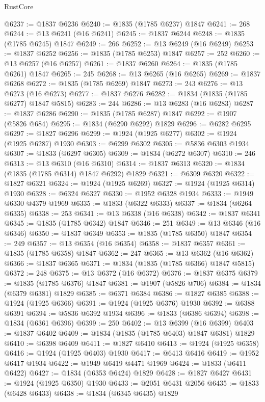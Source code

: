 \begin{lexlean}{RustCore}
\begin{coremodule}
@6237 := @1837 @6236
@6240 := @1835 (@1785 @6237) @1847
@6241 := 268
@6244 := @13 @6241 (@16 @6241)
@6245 := @1837 @6244
@6248 := @1835 (@1785 @6245) @1847
@6249 := 266
@6252 := @13 @6249 (@16 @6249)
@6253 := @1837 @6252
@6256 := @1835 (@1785 @6253) @1847
@6257 := 252
@6260 := @13 @6257 (@16 @6257)
@6261 := @1837 @6260
@6264 := @1835 (@1785 @6261) @1847
@6265 := 245
@6268 := @13 @6265 (@16 @6265)
@6269 := @1837 @6268
@6272 := @1835 (@1785 @6269) @1847
@6273 := 243
@6276 := @13 @6273 (@16 @6273)
@6277 := @1837 @6276
@6282 := @1834 (@1835 (@1785 @6277) @1847 @5815)
@6283 := 244
@6286 := @13 @6283 (@16 @6283)
@6287 := @1837 @6286
@6290 := @1835 (@1785 @6287) @1847
@6292 := @1907 (@5826 @684)
@6295 := @1834 (@6290 @6292) @1829
@6296 := @6282 @6295
@6297 := @1827 @6296
@6299 := @1924 (@1925 @6277)
@6302 := @1924 (@1925 @6287) @1930
@6303 := @6299 @6302
@6305 := @5836 @6303 @1934
@6307 := @1833 (@6297 @6305)
@6309 := @1834 (@6272 @6307)
@6310 := 246
@6313 := @13 @6310 (@16 @6310)
@6314 := @1837 @6313
@6320 := @1834 (@1835 (@1785 @6314) @1847 @6292) @1829
@6321 := @6309 @6320
@6322 := @1827 @6321
@6324 := @1924 (@1925 @6269)
@6327 := @1924 (@1925 @6314) @1930
@6328 := @6324 @6327
@6330 := @1952 @6328 @1934
@6333 := @1949 @6330 @4379 @1969
@6335 := @1833 (@6322 @6333)
@6337 := @1834 (@6264 @6335)
@6338 := 253
@6341 := @13 @6338 (@16 @6338)
@6342 := @1837 @6341
@6345 := @1835 (@1785 @6342) @1847
@6346 := 251
@6349 := @13 @6346 (@16 @6346)
@6350 := @1837 @6349
@6353 := @1835 (@1785 @6350) @1847
@6354 := 249
@6357 := @13 @6354 (@16 @6354)
@6358 := @1837 @6357
@6361 := @1835 (@1785 @6358) @1847
@6362 := 247
@6365 := @13 @6362 (@16 @6362)
@6366 := @1837 @6365
@6371 := @1834 (@1835 (@1785 @6366) @1847 @5815)
@6372 := 248
@6375 := @13 @6372 (@16 @6372)
@6376 := @1837 @6375
@6379 := @1835 (@1785 @6376) @1847
@6381 := @1907 (@5826 @706)
@6384 := @1834 (@6379 @6381) @1829
@6385 := @6371 @6384
@6386 := @1827 @6385
@6388 := @1924 (@1925 @6366)
@6391 := @1924 (@1925 @6376) @1930
@6392 := @6388 @6391
@6394 := @5836 @6392 @1934
@6396 := @1833 (@6386 @6394)
@6398 := @1834 (@6361 @6396)
@6399 := 250
@6402 := @13 @6399 (@16 @6399)
@6403 := @1837 @6402
@6409 := @1834 (@1835 (@1785 @6403) @1847 @6381) @1829
@6410 := @6398 @6409
@6411 := @1827 @6410
@6413 := @1924 (@1925 @6358)
@6416 := @1924 (@1925 @6403) @1930
@6417 := @6413 @6416
@6419 := @1952 @6417 @1934
@6422 := @1949 @6419 @4471 @1969
@6424 := @1833 (@6411 @6422)
@6427 := @1834 (@6353 @6424) @1829
@6428 := @1827 @6427
@6431 := @1924 (@1925 @6350) @1930
@6433 := @2051 @6431 @2056
@6435 := @1833 (@6428 @6433)
@6438 := @1834 (@6345 @6435) @1829

\end{coremodule}
\end{lexlean}
